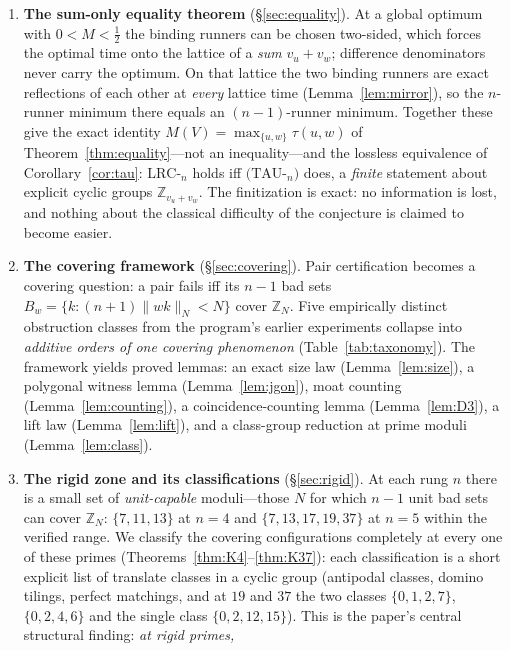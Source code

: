 \documentclass[11pt,a4paper]{article}
\numberwithin{equation}{section}
\theoremstyle{plain}
\theoremstyle{definition}
\theoremstyle{remark}
\newcommand{\Z}{\mathbb{Z}}
\newcommand{\wn}[1]{\lVert #1 \rVert_{N}}
\begin{document}
\begin{enumerate}[leftmargin=1.6em,itemsep=2pt]
\item \textbf{The sum-only equality theorem}
  (\S\ref{sec:equality}). At a global optimum with $0<M<\tfrac12$ the
  binding runners can be chosen two-sided, which forces the optimal time
  onto the lattice of a \emph{sum} $v_u+v_w$; difference denominators never
  carry the optimum. On that lattice the two binding runners are exact
  reflections of each other at \emph{every} lattice time
  (Lemma~\ref{lem:mirror}), so the $n$-runner minimum there equals an
  $(n{-}1)$-runner minimum. Together these give the exact identity
  $M(V)=\max_{\{u,w\}}\tau(u,w)$ of Theorem~\ref{thm:equality}---not an
  inequality---and the lossless equivalence of
  Corollary~\ref{cor:tau}: $\mathrm{LRC}$-$_n$ holds iff
  $(\mathrm{TAU}$-$_n)$ does, a \emph{finite} statement about explicit
  cyclic groups $\Z_{v_u+v_w}$. The finitization is exact: no information
  is lost, and nothing about the classical difficulty of the conjecture is
  claimed to become easier.
\item \textbf{The covering framework} (\S\ref{sec:covering}). Pair
  certification becomes a covering question: a pair fails iff its $n-1$ bad
  sets $B_w=\{k : (n{+}1)\wn{wk}<N\}$ cover $\Z_N$. Five empirically
  distinct obstruction classes from the program's earlier experiments
  collapse into \emph{additive orders of one covering phenomenon}
  (Table~\ref{tab:taxonomy}). The framework yields proved lemmas: an exact
  size law (Lemma~\ref{lem:size}), a polygonal witness lemma
  (Lemma~\ref{lem:jgon}), moat counting (Lemma~\ref{lem:counting}), a
  coincidence-counting lemma (Lemma~\ref{lem:D3}), a lift law
  (Lemma~\ref{lem:lift}), and a class-group reduction at prime moduli
  (Lemma~\ref{lem:class}).
\item \textbf{The rigid zone and its classifications}
  (\S\ref{sec:rigid}). At each rung $n$ there is a small set of
  \emph{unit-capable} moduli---those $N$ for which $n-1$ unit bad sets can
  cover $\Z_N$: $\{7,11,13\}$ at $n=4$ and $\{7,13,17,19,37\}$ at $n=5$
  within the verified range. We classify the covering configurations
  completely at every one of these primes
  (Theorems~\ref{thm:K4}--\ref{thm:K37}): each classification is a short
  explicit list of translate classes in a cyclic group (antipodal classes,
  domino tilings, perfect matchings, and at $19$ and $37$ the two classes
  $\{0,1,2,7\}$, $\{0,2,4,6\}$ and the single class $\{0,2,12,15\}$).
  This is the paper's central structural finding: \emph{at rigid primes,
}
\end{enumerate}
\end{document}
